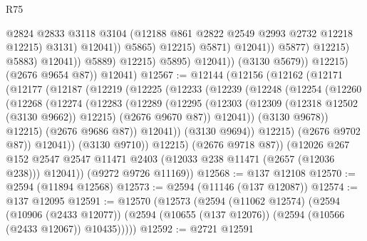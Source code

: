 \begin{lexlean}{R75}
\begin{coremodule}
                                                @2824
                                                @2833
                                                @3118
                                                @3104
                                                (@12188 @861 @2822 @2549 @2993 @2732 @12218 @12215)
                                                @3131)
                                              @12041))
                                          @5865)
                                        @12215)
                                      @5871)
                                    @12041))
                                @5877)
                              @12215)
                            @5883)
                          @12041))
                      @5889)
                    @12215)
                  @5895)
                @12041))
            (@3130 @5679))
          @12215)
        (@2676 @9654 @87))
      @12041)
@12567 := @12144
    (@12156
      (@12162
        (@12171
          (@12177
            (@12187
              (@12219
                (@12225
                  (@12233
                    (@12239
                      (@12248
                        (@12254
                          (@12260
                            (@12268
                              (@12274
                                (@12283
                                  (@12289
                                    (@12295
                                      (@12303
                                        (@12309 (@12318 @12502 (@3130 @9662)) @12215)
                                        (@2676 @9670 @87))
                                      @12041))
                                  (@3130 @9678))
                                @12215)
                              (@2676 @9686 @87))
                            @12041))
                        (@3130 @9694))
                      @12215)
                    (@2676 @9702 @87))
                  @12041))
              (@3130 @9710))
            @12215)
          (@2676 @9718 @87))
        (@12026
          @267
          @152
          @2547
          @2547
          @11471
          @2403
          (@12033 @238 @11471 (@2657 (@12036 @238)))
          @12041))
      (@9272 @9726 @11169))
@12568 := @137 @12108
@12570 := @2594 (@11894 @12568)
@12573 := @2594 (@11146 (@137 @12087))
@12574 := @137 @12095
@12591 := @12570
    (@12573
      (@2594
        (@11062 @12574)
        (@2594
          (@10906 (@2433 @12077))
          (@2594 (@10655 (@137 @12076)) (@2594 (@10566 (@2433 @12067)) @10435)))))
@12592 := @2721 @12591

\end{coremodule}
\end{lexlean}
